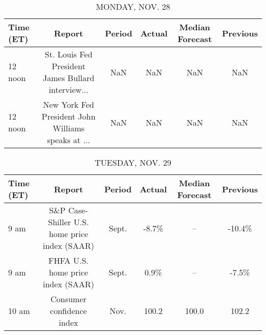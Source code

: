 \documentclass{article}%
\begin{document}
%
\normalsize%


\begin{table}[htbp]%
\caption{MONDAY, NOV. 28}%
\centering%
\begin{adjustbox}{width=1\textwidth}%
\begin{tabular}{lccccc}
\toprule
Time (ET) &                                             Report & Period & Actual & Median Forecast & Previous \\
\midrule
  12 noon & St. Louis Fed President James Bullard interview... &    NaN &    NaN &             NaN &      NaN \\
  12 noon & New York Fed President John Williams speaks at ... &    NaN &    NaN &             NaN &      NaN \\
\bottomrule
\end{tabular}
%
\end{adjustbox}%
\end{table}

%


\begin{table}[htbp]%
\caption{TUESDAY, NOV. 29}%
\centering%
\begin{adjustbox}{width=1\textwidth}%
\begin{tabular}{lccccc}
\toprule
Time (ET) &                                        Report & Period & Actual & Median Forecast & Previous \\
\midrule
     9 am & S\&P Case-Shiller U.S. home price index (SAAR) &  Sept. &  -8.7\% &              -- &   -10.4\% \\
     9 am &             FHFA U.S. home price index (SAAR) &  Sept. &   0.9\% &              -- &    -7.5\% \\
    10 am &                     Consumer confidence index &   Nov. &  100.2 &           100.0 &    102.2 \\
\bottomrule
\end{tabular}
%
\end{adjustbox}%
\end{table}

%
\end{document}
